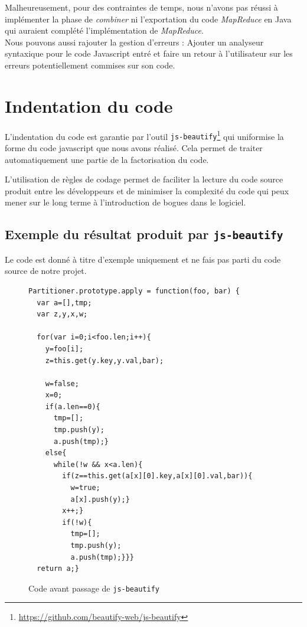 Malheureusement, pour des contraintes de temps, nous n'avons pas réussi à implémenter la phase de {\it combiner} ni l'exportation du code {\it MapReduce} en Java qui auraient complété l'implémentation de {\it MapReduce}.\\

Nous pouvons aussi rajouter la gestion d'erreurs :
Ajouter un analyseur syntaxique pour le code Javascript entré et faire un retour à l'utilisateur sur les erreurs potentiellement commises sur son code.

\section{Indentation du code}

L'indentation du code est garantie par l'outil {\tt js-beautify}\footnote{\url{https://github.com/beautify-web/js-beautify}}
qui uniformise la forme du code javascript que nous avons réalisé. Cela permet de traiter automatiquement une partie de la factorisation du code.

L'utilisation de règles de codage permet de faciliter la lecture du code source produit entre les développeurs et de minimiser la complexité du code qui peux mener sur le long terme à l'introduction de bogues dans le logiciel.

\subsection{Exemple du résultat produit par {\tt js-beautify}}
Le code est donné à titre d'exemple uniquement et ne fais pas parti du code source de notre projet.

\begin{figure}[H]
\begin{lstlisting}
Partitioner.prototype.apply = function(foo, bar) {
  var a=[],tmp;
  var z,y,x,w;

  for(var i=0;i<foo.len;i++){
    y=foo[i];
    z=this.get(y.key,y.val,bar);

    w=false;
    x=0;
    if(a.len==0){
      tmp=[];
      tmp.push(y);
      a.push(tmp);}
    else{
      while(!w && x<a.len){
        if(z==this.get(a[x][0].key,a[x][0].val,bar)){
          w=true;
          a[x].push(y);}
        x++;}
        if(!w){
          tmp=[];
          tmp.push(y);
          a.push(tmp);}}}
  return a;}
\end{lstlisting}
\caption{Code avant passage de {\tt js-beautify}}
\end{figure}

